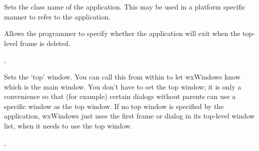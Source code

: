 \label{wxappsetclassname}


Sets the class name of the application. This may be used in a platform specific
manner to refer to the application.




\label{wxappsetexitonframedelete}


Allows the programmer to specify whether the application will exit when the
top-level frame is deleted.




,\\


\label{wxappsettopwindow}


Sets the `top' window. You can call this from within  to
let wxWindows know which is the main window. You don't have to set the top window;
it is only a convenience so that (for example) certain dialogs without parents can use a
specific window as the top window. If no top window is specified by the application,
wxWindows just uses the first frame or dialog in its top-level window list, when it
needs to use the top window.




, 



\label{wxappsetvendorname}


